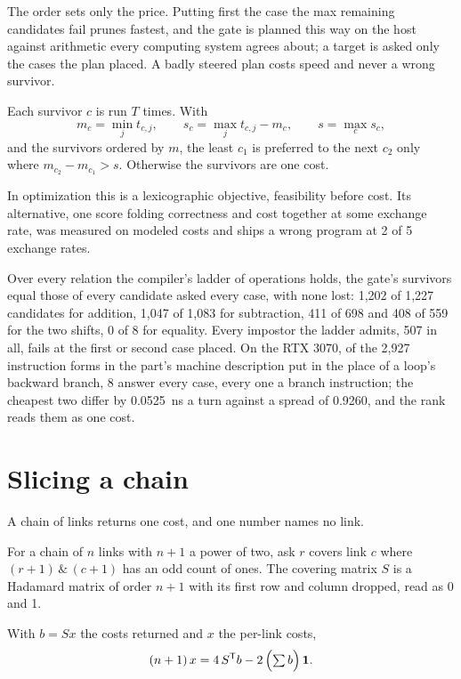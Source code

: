The order sets only the price. Putting first the case the max remaining candidates fail prunes
fastest, and the gate is planned this way on the host against arithmetic every computing system
agrees about; a target is asked only the cases the plan placed. A badly steered plan costs speed
and never a wrong survivor.

\begin{definition}[Rank]
Each survivor \(c\) is run \(T\) times. With
\[
  m_c = \min_j t_{c,j}, \qquad s_c = \max_j t_{c,j} - m_c, \qquad s = \max_c s_c,
\]
and the survivors ordered by \(m\), the least \(c_1\) is preferred to the next \(c_2\) only where
\(m_{c_2} - m_{c_1} > s\). Otherwise the survivors are one cost.
\end{definition}

In optimization this is a lexicographic objective, feasibility before cost. Its alternative, one
score folding correctness and cost together at some exchange rate, was measured on modeled
costs and ships a wrong program at 2 of 5 exchange rates.

Over every relation the compiler's ladder of operations holds, the gate's survivors equal those
of every candidate asked every case, with none lost: 1,202 of 1,227 candidates for addition,
1,047 of 1,083 for subtraction, 411 of 698 and 408 of 559 for the two shifts, 0 of 8 for
equality. Every impostor the ladder admits, 507 in all, fails at the first or second case placed.
On the RTX 3070, of the 2,927 instruction forms in the part's machine description put in the
place of a loop's backward branch, 8 answer every case, every one a branch instruction; the
cheapest two differ by 0.0525~ns a turn against a spread of 0.9260, and the rank reads them as one
cost.

\section{Slicing a chain}

A chain of links returns one cost, and one number names no link.

\begin{definition}
For a chain of \(n\) links with \(n+1\) a power of two, ask \(r\) covers link \(c\) where
\((r+1)\,\&\,(c+1)\) has an odd count of ones. The covering matrix \(S\) is a Hadamard matrix of
order \(n+1\) with its first row and column dropped, read as 0 and 1.
\end{definition}

\begin{proposition}
\label{prop:slice}
With \(b = Sx\) the costs returned and \(x\) the per-link costs,
\[
  (n+1)\,x = 4\, S^{\mathsf T} b - 2\,\Bigl(\textstyle\sum b\Bigr)\,\mathbf 1.
\]
\end{proposition}

